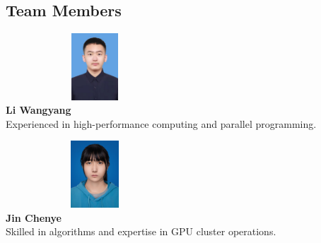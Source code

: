 \documentclass[a4paper,12pt]{article}
\begin{document}
\subsection{Team Members}
\begin{table}[H]
\centering
\begin{center}
    \begin{minipage}{0.45\textwidth}
        \centering
        \includegraphics[width=0.5\textwidth, height=2.5cm, keepaspectratio]{Li_Wangyang.png}\\[0.3cm]
        \textbf{Li Wangyang}\\[0.3cm]
        \small{Experienced in high-performance computing and parallel programming.}
    \end{minipage}
\begin{minipage}{0.45\textwidth}
    \centering
    \includegraphics[width=0.5\textwidth, height=2.5cm, keepaspectratio]{Jin_Chenye.png}\\[0.3cm]
    \textbf{Jin Chenye}\\[0.3cm]
    \small{Skilled in algorithms and expertise in GPU cluster operations.}
\end{minipage}

\vspace{1cm}


\end{center}
\end{table}
\end{document}

